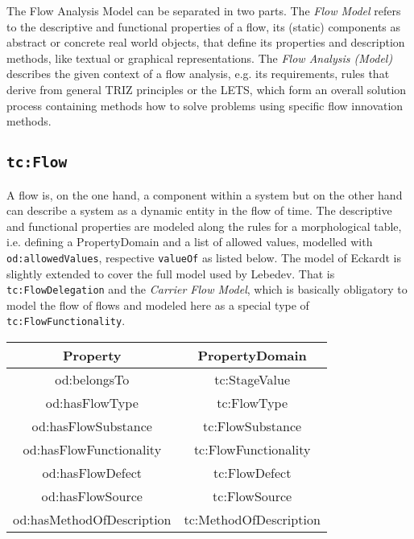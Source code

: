 \documentclass[a4paper,11pt]{article}
\begin{document}
    \cite{HGGA}

    The Flow Analysis Model can be separated in two parts. The 
    \emph{Flow Model} refers to the descriptive and functional properties
    of a flow, its (static) components as abstract or concrete real world 
    objects, that define its properties and description methods, like
    textual or graphical representations. The \emph{Flow Analysis (Model)}
    describes the given context of a flow analysis, e.g. its requirements,
    rules that derive from general TRIZ principles or the LETS, which form
    an overall solution process containing methods how to solve problems using 
    specific flow innovation methods. 

    \subsection{\texttt{tc:Flow}}

    A flow is, on the one hand, a component within a system but on the other 
    hand can describe a system as a dynamic entity in the flow of time. The 
    descriptive and functional properties are modeled along the rules for a 
    morphological table, i.e. defining a PropertyDomain and a list of allowed 
    values, modelled with \texttt{od:allowedValues}, respective \texttt{valueOf} 
    as listed below. The model of Eckardt is slightly extended to cover the 
    full model used by Lebedev. That is \texttt{tc:FlowDelegation} and the
    \emph{Carrier Flow Model}, which is basically obligatory to model the flow 
    of flows and modeled here as a special type of \texttt{tc:FlowFunctionality}.

    \begin{center}
    \begin{tabular}{|c|c|}\hline
        Property & PropertyDomain \\\hline
        od:belongsTo & tc:StageValue \\
        od:hasFlowType & tc:FlowType  \\
        od:hasFlowSubstance & tc:FlowSubstance  \\
        od:hasFlowFunctionality & tc:FlowFunctionality  \\
        od:hasFlowDefect & tc:FlowDefect  \\
        od:hasFlowSource & tc:FlowSource  \\
        od:hasMethodOfDescription & tc:MethodOfDescription \\\hline 
    \end{tabular}
    \end{center}
\end{document}
